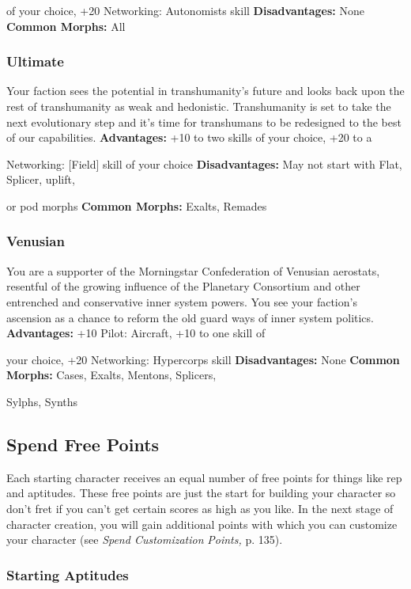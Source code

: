 of your choice, +20 Networking: Autonomists skill
\textbf{Disadvantages:} None
\textbf{Common Morphs:} All

\subsubsection{Ultimate}

Your faction sees the potential in transhumanity's 
future and looks back upon the rest of transhumanity
as weak and hedonistic. Transhumanity is set
to take the next evolutionary step and it's time for 
transhumans to be redesigned to the best of our 
capabilities.
\textbf{Advantages:} +10 to two skills of your choice, +20 to a 

Networking: [Field] skill of your choice
\textbf{Disadvantages:} May not start with Flat, Splicer, uplift, 

or pod morphs
\textbf{Common Morphs: }Exalts, Remades

\subsubsection{Venusian}

You are a supporter of the Morningstar Confederation
of Venusian aerostats, resentful of the growing
influence of the Planetary Consortium and other entrenched
and conservative inner system powers. You
see your faction's ascension as a chance to reform the 
old guard ways of inner system politics.
\textbf{Advantages:} +10 Pilot: Aircraft, +10 to one skill of 

your choice, +20 Networking: Hypercorps skill
\textbf{Disadvantages:} None
\textbf{Common Morphs:} Cases, Exalts, Mentons, Splicers, 

Sylphs, Synths

\subsection{Spend Free Points}

Each starting character receives an equal number of 
free points for things like rep and aptitudes. These 
free points are just the start for building your character
so don't fret if you can't get certain scores as high
as you like. In the next stage of character creation, 
you will gain additional points with which you can 
customize your character (see \textit{Spend Customization }
\textit{Points,} p. 135).

\subsubsection{Starting Aptitudes}

